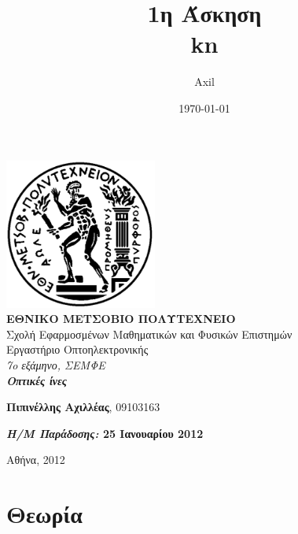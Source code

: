 \documentclass[a4paper,11pt,titlepage]{article}
\title{1η Άσκηση\\kn}
\author{Axil}
\date{\today}
\begin{document}
\pagestyle{headings}    %

\begin{titlepage}
\begin{center}
\includegraphics[width=50mm]{pyrforos.pdf}\\[0.5cm]
\textbf{\LARGE ΕΘΝΙΚΟ ΜΕΤΣΟΒΙΟ ΠΟΛΥΤΕΧΝΕΙΟ}\\
\textrm{\Large Σχολή Εφαρμοσμένων Μαθηματικών και Φυσικών Επιστημών}\\[2.0cm]
\Huge{Εργαστήριο Οπτοηλεκτρονικής}\\
\Large{\textit{7o εξάμηνο, ΣΕΜΦΕ}}\\[2.0cm]
\Large{\textit{\textbf{ Οπτικές ίνες}}}\\[5.0cm]
\normalsize
\begin{minipage}{0.49\textwidth}
\begin{flushleft}
\textbf{Πιπινέλλης Αχιλλέας}, 09103163
\end{flushleft}
\end{minipage}
\begin{minipage}{0.49\textwidth}
\begin{flushright}
\textbf{\textit{Η/Μ Παράδοσης:} 25 Ιανουαρίου 2012}
\end{flushright}
\end{minipage}

\vfill
{Αθήνα, 2012}


\end{center}
\end{titlepage}

\section{Θεωρία}
\end{document}
